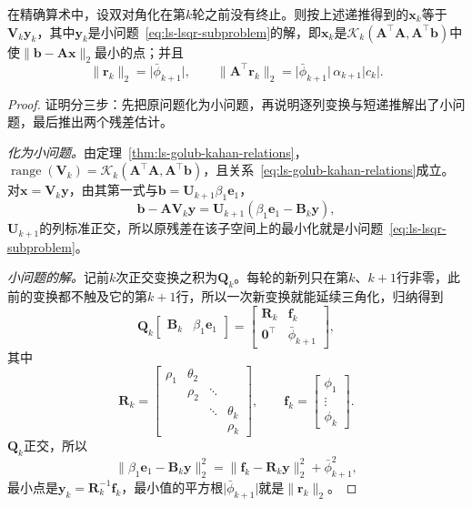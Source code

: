 \begin{theorem}[LSQR递推的正确性]
\label{thm:ls-lsqr-recursion}
在精确算术中，设双对角化在第$k$轮之前没有终止。则按上述递推得到的$\bm x_k$等于$\bm V_k\bm y_k$，其中$\bm y_k$是小问题~\eqref{eq:ls-lsqr-subproblem}的解，即$\bm x_k$是$\mathcal K_k(\bm A^\top\bm A,\bm A^\top\bm b)$中使$\lVert\bm b-\bm A\bm x\rVert_2$最小的点；并且
\[
 \lVert\bm r_k\rVert_2=\lvert\bar\phi_{k+1}\rvert,\qquad
 \lVert\bm A^\top\bm r_k\rVert_2=\lvert\bar\phi_{k+1}\rvert\,\alpha_{k+1}\lvert c_k\rvert .
\]
\end{theorem}

\begin{proof}
证明分三步：先把原问题化为小问题，再说明逐列变换与短递推解出了小问题，最后推出两个残差估计。

\emph{化为小问题。}由定理~\ref{thm:ls-golub-kahan-relations}，$\operatorname{range}(\bm V_k)=\mathcal K_k(\bm A^\top\bm A,\bm A^\top\bm b)$，且关系~\eqref{eq:ls-golub-kahan-relations}成立。对$\bm x=\bm V_k\bm y$，由其第一式与$\bm b=\bm U_{k+1}\beta_1\bm e_1$，
\[
 \bm b-\bm A\bm V_k\bm y=\bm U_{k+1}(\beta_1\bm e_1-\bm B_k\bm y),
\]
$\bm U_{k+1}$的列标准正交，所以原残差在该子空间上的最小化就是小问题~\eqref{eq:ls-lsqr-subproblem}。

\emph{小问题的解。}记前$k$次正交变换之积为$\bm Q_k$。每轮的新列只在第$k$、$k+1$行非零，此前的变换都不触及它的第$k+1$行，所以一次新变换就能延续三角化，归纳得到
\[
 \bm Q_k\begin{bmatrix}\bm B_k&\beta_1\bm e_1\end{bmatrix}
 =\begin{bmatrix}\bm R_k&\bm f_k\\ \bm0^\top&\bar\phi_{k+1}\end{bmatrix},
\]
其中
\[
 \bm R_k=\begin{bmatrix}
 \rho_1&\theta_2&&\\
 &\rho_2&\ddots&\\
 &&\ddots&\theta_k\\
 &&&\rho_k
 \end{bmatrix},\qquad
 \bm f_k=\begin{bmatrix}\phi_1\\\vdots\\\phi_k\end{bmatrix}.
\]
$\bm Q_k$正交，所以
\[
 \lVert\beta_1\bm e_1-\bm B_k\bm y\rVert_2^2=\lVert\bm f_k-\bm R_k\bm y\rVert_2^2+\bar\phi_{k+1}^2 ,
\]
最小点是$\bm y_k=\bm R_k^{-1}\bm f_k$，最小值的平方根$\lvert\bar\phi_{k+1}\rvert$就是$\lVert\bm r_k\rVert_2$。


\end{proof}
